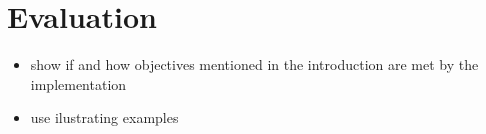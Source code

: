 \chapter{Evaluation}

\begin{itemize}
\item show if and how objectives mentioned in the introduction are met by the implementation
\item use ilustrating examples
\end{itemize}
